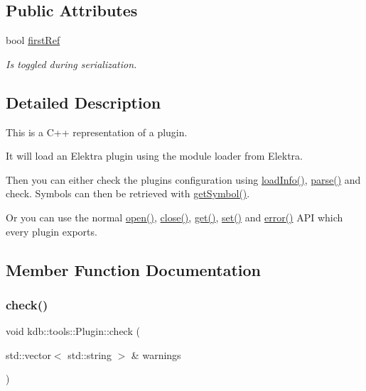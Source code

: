 \subsection*{Public Attributes}
\begin{DoxyCompactItemize}
\item 
bool \mbox{\hyperlink{classkdb_1_1tools_1_1Plugin_aee8ae2b5708c74d4ccdc1bf9e8794636}{first\+Ref}}
\begin{DoxyCompactList}\small\item\em Is toggled during serialization. \end{DoxyCompactList}\end{DoxyCompactItemize}


\subsection{Detailed Description}
This is a C++ representation of a plugin. 

It will load an Elektra plugin using the module loader from Elektra.

Then you can either check the plugins configuration using \mbox{\hyperlink{classkdb_1_1tools_1_1Plugin_a3a0c6a956d1714002ef9baf8c9d99167}{load\+Info()}}, \mbox{\hyperlink{classkdb_1_1tools_1_1Plugin_adfcba2fbdeb436a1083410df804d5fb0}{parse()}} and check. Symbols can then be retrieved with \mbox{\hyperlink{classkdb_1_1tools_1_1Plugin_aca31140802ab463d5bddd95dee73194d}{get\+Symbol()}}.

Or you can use the normal \mbox{\hyperlink{classkdb_1_1tools_1_1Plugin_a680a490123b5290441d76ef2c1e3f1fa}{open()}}, \mbox{\hyperlink{classkdb_1_1tools_1_1Plugin_a40b5fd413f3f6da735680ed8d7c8a6a2}{close()}}, \mbox{\hyperlink{classkdb_1_1tools_1_1Plugin_a2aa6ff55f9cf81a59d2a8d271fe68e0f}{get()}}, \mbox{\hyperlink{classkdb_1_1tools_1_1Plugin_abf84d512b48f6fa1b89636217537cde0}{set()}} and \mbox{\hyperlink{classkdb_1_1tools_1_1Plugin_a8ec348b49a34ef17fda64cb289b8cf64}{error()}} A\+PI which every plugin exports. 

\subsection{Member Function Documentation}
\mbox{\label{classkdb_1_1tools_1_1Plugin_a5bb3db65b9d87d18787da8cc65eaca65}} 
\subsubsection{\texorpdfstring{check()}{check()}}
{\footnotesize\ttfamily void kdb\+::tools\+::\+Plugin\+::check (\begin{DoxyParamCaption}\item[{std\+::vector$<$ std\+::string $>$ \&}]{warnings }\end{DoxyParamCaption})}




